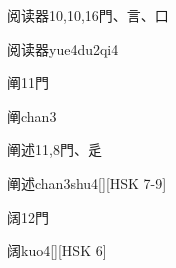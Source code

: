 \begin{Entry}{阅读器}{10,10,16}{⾨、⾔、⼝}
  \begin{Phonetics}{阅读器}{yue4du2qi4}
  \end{Phonetics}
\end{Entry}

\begin{Entry}{阐}{11}{⾨}
  \begin{Phonetics}{阐}{chan3}
  \end{Phonetics}
\end{Entry}

\begin{Entry}{阐述}{11,8}{⾨、⾡}
  \begin{Phonetics}{阐述}{chan3shu4}[][HSK 7-9]
  \end{Phonetics}
\end{Entry}

\begin{Entry}{阔}{12}{⾨}
  \begin{Phonetics}{阔}{kuo4}[][HSK 6]
  \end{Phonetics}
\end{Entry}


